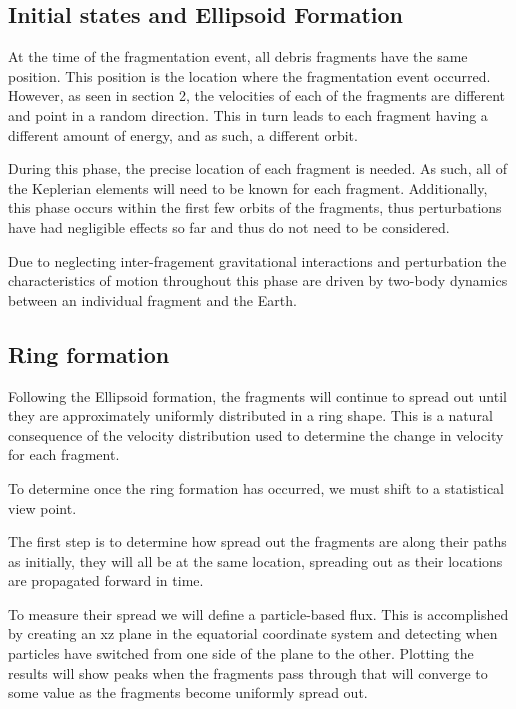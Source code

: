 \documentclass{article}
\begin{document}
\subsection{Initial states and Ellipsoid Formation}

At the time of the fragmentation event, all debris fragments have the same position. This position is the location where the fragmentation event occurred. However, as seen in section 2, the velocities of each of the fragments are different and point in a random direction. This in turn leads to each fragment having a different amount of energy, and as such, a different orbit. 

During this phase, the precise location of each fragment is needed. As such,  all of the Keplerian elements will need to be known for each fragment. Additionally, this phase occurs within the first few orbits of the fragments, thus perturbations have had negligible effects so far and thus do not need to be considered. 

Due to neglecting inter-fragement gravitational interactions and perturbation the characteristics of motion throughout this phase are driven by two-body dynamics between an individual fragment and the Earth.

\subsection{Ring formation}

Following the Ellipsoid formation, the fragments will continue to spread out until they are approximately uniformly distributed in a ring shape. This is a natural consequence of the velocity distribution used to determine the change in velocity for each fragment.

To determine once the ring formation has occurred, we must shift to a statistical view point.

The first step is to determine how spread out the fragments are along their paths as initially, they will all be at the same location, spreading out as their locations are propagated forward in time.

To measure their spread we will define a particle-based flux. This is accomplished by creating an xz plane in the equatorial coordinate system and detecting when particles have switched from one side of the plane to the other. Plotting the results will show peaks when the fragments pass through that will converge to some value as the fragments become uniformly spread out.
\end{document}
